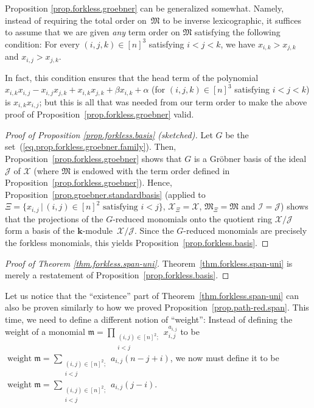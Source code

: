 \documentclass[pdftex]{sigma}
\numberwithin{equation}{section}
\let\sumnonlimits\sum
\let\prodnonlimits\prod
\renewcommand{\sum}{\sumnonlimits\limits}
\renewcommand{\prod}{\prodnonlimits\limits}
\begin{document}
\begin{Remark}Proposition \ref{prop.forkless.groebner} can be generalized somewhat. Namely, instead of requiring the total order on~$\mathfrak{M}$ to be inverse lexicographic, it suffices to assume that we are given \textit{any} term order on $\mathfrak{M}$ satisfying the following condition: For every $(i,j,k) \in[n] ^{3}$ satisfying $i<j<k$, we have $x_{i,k}>x_{j,k}$ and $x_{i,j}>x_{j,k}$.

In fact, this condition ensures that the head term of the polynomial $x_{i,k}x_{i,j}-x_{i,j}x_{j,k}+x_{i,k}x_{j,k}+\beta x_{i,k}+\alpha$ (for
$(i,j,k) \in[n] ^{3}$ satisfying $i<j<k$) is $x_{i,k}x_{i,j}$; but this is all that was needed from our term order to make the above proof of Proposition~\ref{prop.forkless.groebner} valid.
\end{Remark}

\begin{proof}[Proof of Proposition \ref{prop.forkless.basis} (sketched)]Let $G$ be the set~(\ref{eq.prop.forkless.groebner.family}). Then, Proposition~\ref{prop.forkless.groebner} shows that $G$ is a Gr\"{o}bner basis of the ideal~$\mathcal{J}$ of $\mathcal{X}$ (where $\mathfrak{M}$ is endowed with the term order defined in Proposition~\ref{prop.forkless.groebner}). Hence, Proposition~\ref{prop.groebner.standardbasis} (applied to $\Xi= \{x_{i,j}\,|\, (i,j) \in[n] ^{2}\text{ satisfying }i<j \} $, $\mathcal{X}_{\Xi}=\mathcal{X}$, $\mathfrak{M}_{\Xi}=\mathfrak{M}$ and $\mathcal{I}=\mathcal{J}$) shows that the projections of the $G$-reduced monomials onto the quotient ring $\mathcal{X}/\mathcal{J}$ form a basis of the $\mathbf{k}$-module~$\mathcal{X}/\mathcal{J}$. Since the $G$-reduced monomials are precisely the forkless monomials, this yields
Proposition~\ref{prop.forkless.basis}.
\end{proof}

\begin{proof}[Proof of Theorem \ref{thm.forkless.span-uni}] Theorem~\ref{thm.forkless.span-uni} is merely a restatement of Proposi\-tion~\ref{prop.forkless.basis}.
\end{proof}

\begin{Remark}\label{rmk.forkless.span-uni.existence}Let us notice that the ``existence'' part of Theorem~\ref{thm.forkless.span-uni} can also be proven similarly to how we proved Proposition~\ref{prop.path-red.span}. This time, we need to define a different notion of ``weight'': Instead of defining the weight of a monomial $\mathfrak{m}=\prod_{\substack{(i,j) \in[n] ^{2};\\i<j}}x_{i,j}^{a_{i,j}}$ to be $\operatorname*{weight}\mathfrak{m}=\sum_{\substack{(i,j) \in[n] ^{2};\\i<j}}a_{i,j}(n-j+i) $, we now must define it to be $\operatorname*{weight}\mathfrak{m}=\sum_{\substack{(i,j) \in[n] ^{2};\\i<j}}a_{i,j}( j-i)$.
\end{Remark}
\end{document}
